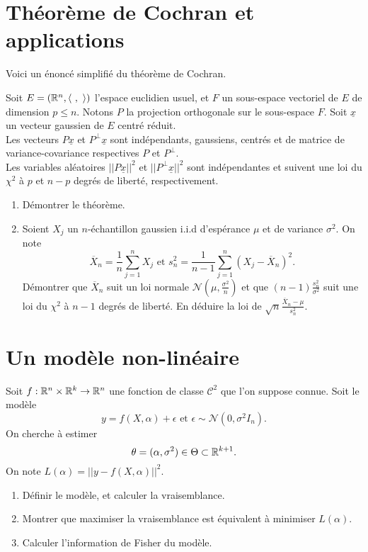 \section{Théorème de Cochran et applications}

Voici un énoncé simplifié du théorème de Cochran.
\begin{thm}[Cochran]
Soit $E=(\mathbb R^n,\langle \ ,\ \rangle)$ l'espace euclidien usuel, et $F$ un sous-espace vectoriel de $E$ de dimension $p\leq n$. Notons $P$ la projection orthogonale sur le sous-espace $F$. Soit $\underline x$ un vecteur gaussien de $E$ centré réduit. \\
Les vecteurs $P\underline x$ et $P^{\perp}\underline x$ sont indépendants, gaussiens, centrés et de matrice de variance-covariance respectives $P$ et $P^{\perp}$.\\
Les variables aléatoires $||P\underline x||^2$ et $||P^{\perp}\underline x||^2$ sont indépendantes et suivent une loi du $\chi^2$ à $p$ et $n-p$ degrés de liberté, respectivement.
\end{thm}

\begin{enumerate}
\item Démontrer le théorème.
\item Soient $X_j$ un $n$-échantillon gaussien i.i.d d'espérance $\mu$ et de variance $\sigma^2$. On note
\[\overline X_n = \frac{1}{n}\sum_{j=1}^n X_j\text{  et  } s^2_n=\frac{1}{n-1} \sum_{j=1}^n (X_j-\overline X_n)^2.\]
Démontrer que $\overline X_n $ suit un loi normale $\mathcal N(\mu, \frac{\sigma^2}{n})$ et que $(n-1)\frac{s^2_n}{\sigma^2}$ suit une loi du $\chi^2$ à $n-1$ degrés de liberté. En déduire la loi de $\sqrt{n}\frac{\overline X_n -\mu}{s^2_n}$.
\end{enumerate}

\section{Un modèle non-linéaire}

Soit $f : \mathbb R^n \times \mathbb R^k \rightarrow \mathbb R^n$ une fonction de classe $\mathcal C^2$ que l'on suppose connue. Soit le modèle 
\[y=f(X,\alpha)+\epsilon \text{  et  } \epsilon \sim \mathcal N(0,\sigma^2 I_n).\] 
On cherche à estimer \[\theta=(\alpha, \sigma^2) \in \Theta\subset \mathbb R^{k+1}.\]
On note $L(\alpha)=||y-f(X,\alpha)||^2$.\\
\begin{enumerate}
\item Définir le modèle, et calculer la vraisemblance.
\item Montrer que maximiser la vraisemblance est équivalent à minimiser $L(\alpha)$. 
\item Calculer l'information de Fisher du modèle.
\end{enumerate}

